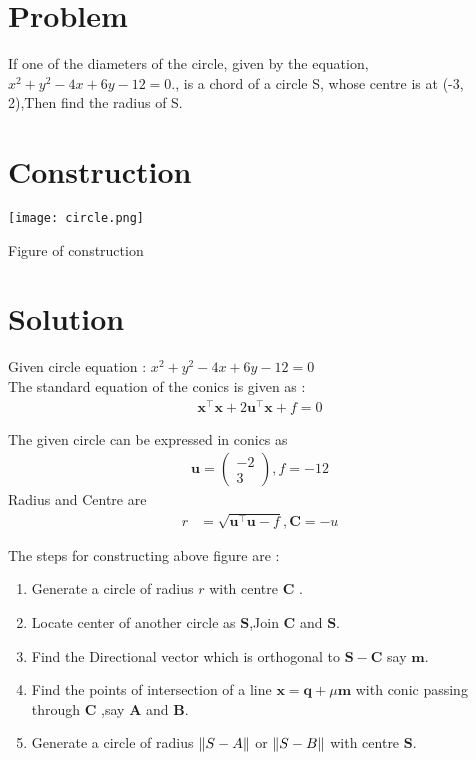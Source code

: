 \documentclass[10pt, a4paper]{article}
\title{\mytitle}
\author{\myauthor\hspace{1em}\\\contact\\FWC22011\hspace{6.5em}IITH\hspace{0.5em}\mymodule\hspace{6em}Matrix:Circle}
\date{}
\newcommand{\myvec}[1]{\ensuremath{\begin{pmatrix}#1\end{pmatrix}}}
\let\vec\mathbf
\begin{document}
	\maketitle
	\tableofcontents
   \section{Problem}
If one of the diameters of the circle, given by the equation,
$x^2 + y^2-4x+6y-12=0$., is a chord of a circle S, whose centre is at (-3, 2),Then find the radius of S.

\section{Construction}
  \texttt{[image: circle.png]}
  	\begin{center}
  Figure of construction
  	\end{center}
  \section{Solution}
  Given circle equation : $x^2+y^2-4x+6y-12=0$\\
The standard equation of the conics is given as :
\begin{align}
\vec{x}^{\top}\vec{x}+2\vec{u}^{\top}\vec{x}+f=0
\label{eq:conic}
\end{align}


The given circle  can be expressed in  conics as\\ 
\begin{align}
\vec{u} = \myvec{-2 \\3} , f = -12 
\end{align}
Radius and Centre are
	\begin{align}
	r &=\sqrt{{\vec{u}^{\top}\vec{u}}-f }  ,   \vec{C}=-u
  \end{align}


  
    The steps for constructing above figure are :
\begin{enumerate}
 \item Generate a circle of radius $r$ with centre $\vec{C}$ .
 \item Locate center of another circle  as $\vec{S}$,Join $\vec{C}$ and $\vec{S}$.
 \item Find the Directional vector which is orthogonal to $\vec{S-C}$ say $\vec{m}$.
 \item Find the points of intersection of a line $\vec{x}=\vec{q}+\mu\vec{m}$ with conic passing through $\vec{C}$ ,say $\vec{A}$ and $\vec{B}$.
\item Generate a circle of radius $\norm{S-A}$ or $\norm{S-B}$ with centre $\vec{S}$.
\end{enumerate}
\end{document}
